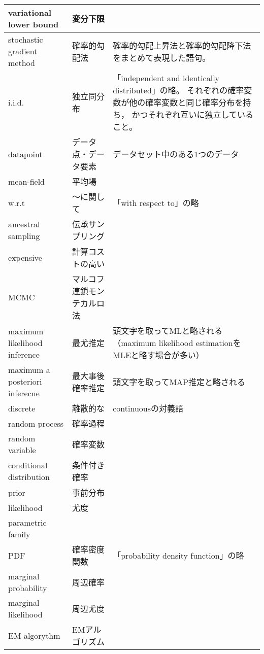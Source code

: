 \documentclass[dvipdfmx, fleqn]{jsarticle}
\begin{document}
\begin{longtable}{p{4cm}p{4cm}p{7cm}}
        variational lower bound
            & 変分下限
            & 
            \tabularnewline \hline
        stochastic gradient method
            & 確率的勾配法
            & 確率的勾配上昇法と確率的勾配降下法をまとめて表現した語句。
            \tabularnewline \hline
        i.i.d.
            & 独立同分布
            & 「independent and identically distributed」の略。
            それぞれの確率変数が他の確率変数と同じ確率分布を持ち，
            かつそれぞれ互いに独立していること。
            \tabularnewline \hline
        datapoint
            & データ点・データ要素
            & データセット中のある1つのデータ
            \tabularnewline \hline
        mean-field
            & 平均場
            & 
            \tabularnewline \hline
        w.r.t
            & ～に関して
            & 「with respect to」の略
            \tabularnewline \hline
        ancestral sampling
            & 伝承サンプリング
            & 
            \tabularnewline \hline
        expensive
            & 計算コストの高い
            & 
            \tabularnewline \hline
        MCMC
            & マルコフ連鎖モンテカルロ法
            & 
            \tabularnewline \hline
        maximum likelihood inference
            & 最尤推定
            & 頭文字を取ってMLと略される
            （maximum likelihood estimationをMLEと略す場合が多い）
            \tabularnewline \hline
        maximum a posteriori inferecne
            & 最大事後確率推定
            & 頭文字を取ってMAP推定と略される
            \tabularnewline \hline
        discrete
            & 離散的な
            & continuousの対義語
            \tabularnewline \hline
        random process
            & 確率過程
            & 
            \tabularnewline \hline
        random variable
            & 確率変数
            & 
            \tabularnewline \hline
        conditional distribution
            & 条件付き確率
            & 
            \tabularnewline \hline
        prior
            & 事前分布
            & 
            \tabularnewline \hline
        likelihood
            & 尤度
            & 
            \tabularnewline \hline
        parametric family
            & 
            & 
            \tabularnewline \hline
        PDF
            & 確率密度関数
            & 「probability density function」の略
            \tabularnewline \hline
        marginal probability
            & 周辺確率
            & 
            \tabularnewline \hline
        marginal likelihood
            & 周辺尤度
            & 
            \tabularnewline \hline
        EM algorythm
            & EMアルゴリズム
            & 

\end{longtable}
\end{document}
